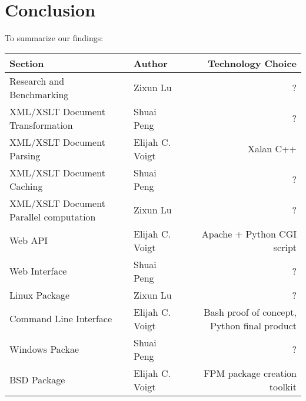 \section{Conclusion}

To summarize our findings:

\begin{center}
    \begin{tabular}{ | l | p{5cm} | r | }
    \hline
    Section & Author & Technology Choice\\ \hline
    Research and Benchmarking & Zixun Lu & ? \\ \hline
    XML/XSLT Document Transformation & Shuai Peng & ? \\ \hline
    XML/XSLT Document Parsing & Elijah C. Voigt & Xalan C++ \\ \hline
    XML/XSLT Document Caching & Shuai Peng & ? \\ \hline
    XML/XSLT Document Parallel computation & Zixun Lu & ? \\ \hline
    Web API & Elijah C. Voigt & Apache + Python CGI script \\ \hline
    Web Interface & Shuai Peng & ? \\ \hline
    Linux Package & Zixun Lu & ? \\ \hline
    Command Line Interface& Elijah C. Voigt & Bash proof of concept, Python final product \\ \hline
    Windows Packae & Shuai Peng & ? \\ \hline
    BSD Package & Elijah C. Voigt & FPM package creation toolkit \\ \hline
    \end{tabular}
\end{center}

\clearpage
